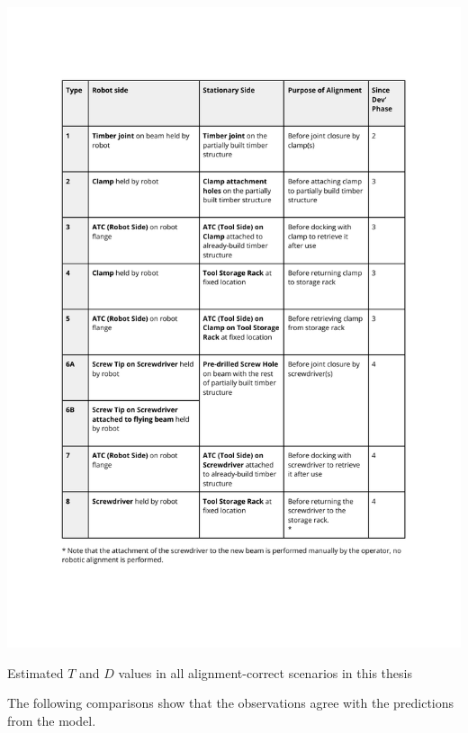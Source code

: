\begin{table}
    \includegraphics[page=8, trim=25.4mm 100mm 25.4mm 33mm, clip, width=\textwidth]{tables/Tables in Chapter 9 to 11.pdf}
    \caption{Estimated $T$ and $D$ values in all alignment-correct scenarios in this thesis}
    \label{table:t-and-d-values-for-all-alignment}
\end{table}

The following comparisons show that the observations agree with the predictions from the model.

